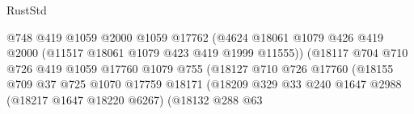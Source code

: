 \begin{lexlean}{RustStd}
\begin{coremodule}
                                                  @748
                                                  @419
                                                  @1059
                                                  @2000
                                                  @1059
                                                  @17762
                                                  (@4624
                                                    @18061
                                                    @1079
                                                    @426
                                                    @419
                                                    @2000
                                                    (@11517 @18061 @1079 @423 @419 @1999 @11555))
                                                  (@18117
                                                    @704
                                                    @710
                                                    @726
                                                    @419
                                                    @1059
                                                    @17760
                                                    @1079
                                                    @755
                                                    (@18127
                                                      @710
                                                      @726
                                                      @17760
                                                      (@18155
                                                        @709
                                                        @37
                                                        @725
                                                        @1070
                                                        @17759
                                                        @18171
                                                        (@18209
                                                          @329
                                                          @33
                                                          @240
                                                          @1647
                                                          @2988
                                                          (@18217 @1647 @18220 @6267)
                                                          (@18132
                                                            @288
                                                            @63

\end{coremodule}
\end{lexlean}
